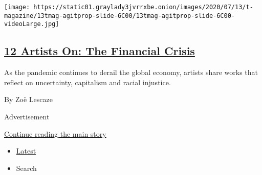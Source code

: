 \begin{enumerate}
  \texttt{[image: https://static01.graylady3jvrrxbe.onion/images/2020/07/13/t-magazine/13tmag-agitprop-slide-6C00/13tmag-agitprop-slide-6C00-videoLarge.jpg]}

  \hypertarget{12-artists-on-the-financial-crisis}{%
  \subsection{\texorpdfstring{\href{/2020/07/21/t-magazine/art-financial-crisis.html}{12
  Artists On: The Financial
  Crisis}}{12 Artists On: The Financial Crisis}}\label{12-artists-on-the-financial-crisis}}

  As the pandemic continues to derail the global economy, artists share
  works that reflect on uncertainty, capitalism and racial injustice.

  By Zoë Lescaze
\end{enumerate}

Advertisement

\protect\hyperlink{after-mid1}{Continue reading the main story}

\begin{itemize}
\tightlist
\item
  \protect\hyperlink{stream-panel}{Latest}
\item
  Search
\end{itemize}

